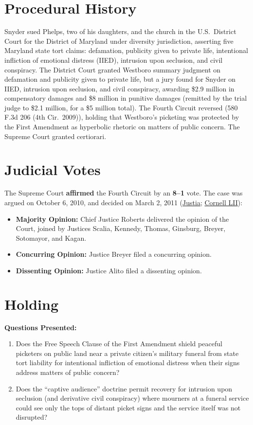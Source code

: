 \documentclass[12pt]{article}
\begin{document}
\section{Procedural History}
Snyder sued Phelps, two of his daughters, and the church in the U.S.\ District Court for the District of Maryland under diversity jurisdiction, asserting five Maryland state tort claims: defamation, publicity given to private life, intentional infliction of emotional distress (IIED), intrusion upon seclusion, and civil conspiracy. The District Court granted Westboro summary judgment on defamation and publicity given to private life, but a jury found for Snyder on IIED, intrusion upon seclusion, and civil conspiracy, awarding \$2.9 million in compensatory damages and \$8 million in punitive damages (remitted by the trial judge to \$2.1 million, for a \$5 million total). The Fourth Circuit reversed (580 F.3d 206 (4th Cir.\ 2009)), holding that Westboro's picketing was protected by the First Amendment as hyperbolic rhetoric on matters of public concern. The Supreme Court granted certiorari.

\section{Judicial Votes}
The Supreme Court \textbf{affirmed} the Fourth Circuit by an \textbf{8--1} vote. The case was argued on October 6, 2010, and decided on March 2, 2011 (\href{https://supreme.justia.com/cases/federal/us/562/443/}{Justia}; \href{https://www.law.cornell.edu/supct/html/09-751.ZO.html}{Cornell LII}):

\begin{itemize}
    \item \textbf{Majority Opinion:} Chief Justice Roberts delivered the opinion of the Court, joined by Justices Scalia, Kennedy, Thomas, Ginsburg, Breyer, Sotomayor, and Kagan.
    \item \textbf{Concurring Opinion:} Justice Breyer filed a concurring opinion.
    \item \textbf{Dissenting Opinion:} Justice Alito filed a dissenting opinion.
\end{itemize}

\section{Holding}
\textbf{Questions Presented:}

\begin{enumerate}
  \item Does the Free Speech Clause of the First Amendment shield peaceful picketers on public land near a private citizen's military funeral from state tort liability for intentional infliction of emotional distress when their signs address matters of public concern?
  \item Does the ``captive audience'' doctrine permit recovery for intrusion upon seclusion (and derivative civil conspiracy) where mourners at a funeral service could see only the tops of distant picket signs and the service itself was not disrupted?
\end{enumerate}
\end{document}
